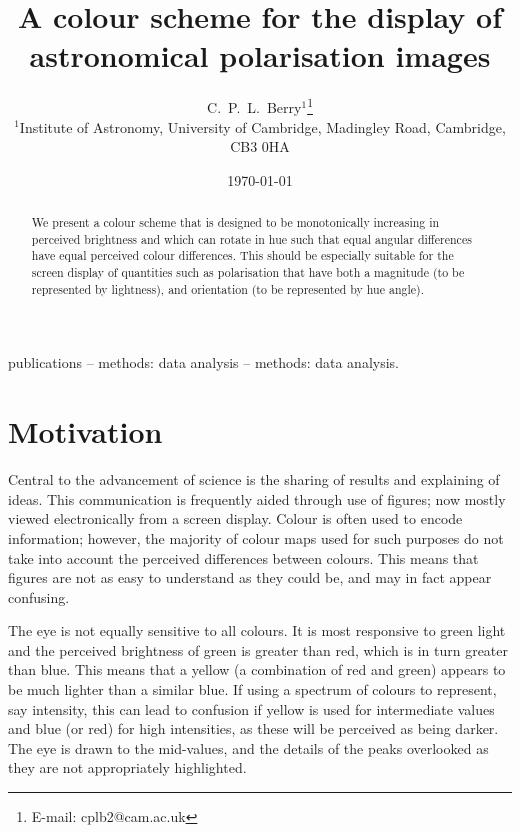 \documentclass[useAMS,usedcolumn,usegraphicx,usenatbib]{mn2e}
\title[A colour scheme for the display of astronomical polarisation images]{A colour scheme for the display of astronomical polarisation images}
\author[C.\ P.\ L.\ Berry]{C.\ P.\ L.\ Berry$^{1}$\thanks{E-mail: cplb2@cam.ac.uk}\\
$^{1}$Institute of Astronomy, University of Cambridge, Madingley Road, Cambridge, CB3 0HA}
\begin{document}
\date{\today}

\pagerange{\pageref{firstpage}--\pageref{lastpage}} 

\maketitle

\label{firstpage}

\begin{abstract}
We present a colour scheme that is designed to be monotonically increasing in perceived brightness and which can rotate in hue such that equal angular differences have equal perceived colour differences. This should be especially suitable for the screen display of quantities such as polarisation that have both a magnitude (to be represented by lightness), and orientation (to be represented by hue angle).
\end{abstract}

\begin{keywords}
publications -- methods: data analysis -- methods: data analysis.
\end{keywords}

\section{Motivation}\label{sec:Intro}

Central to the advancement of science is the sharing of results and explaining of ideas. This communication is frequently aided through use of figures; now mostly viewed electronically from a screen display. Colour is often used to encode information; however, the majority of colour maps used for such purposes do not take into account the perceived differences between colours. This means that figures are not as easy to understand as they could be, and may in fact appear confusing.

The eye is not equally sensitive to all colours. It is most responsive to green light and the perceived brightness of green is greater than red, which is in turn greater than blue. This means that a yellow (a combination of red and green) appears to be much lighter than a similar blue. If using a spectrum of colours to represent, say intensity, this can lead to confusion if yellow is used for intermediate values and blue (or red) for high intensities, as these will be perceived as being darker. The eye is drawn to the mid-values, and the details of the peaks overlooked as they are not appropriately highlighted.
\end{document}
